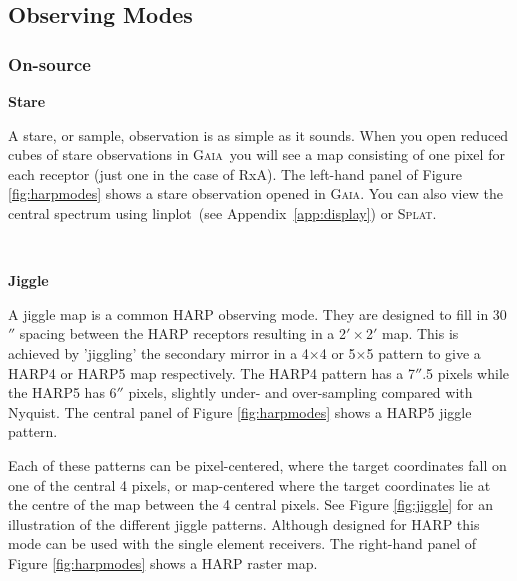 \documentclass[twoside,11pt]{article}
\newcommand{\htmlref}[2]{#1}
\newcommand{\latexhtml}[2]{#1}
\newcommand{\xref}[3]{#1}
\newcommand{\xlabel}[1]{}
\renewcommand{\_}{\texttt{\symbol{95}}}
\newcommand{\gaia}{\xref{\textsc{Gaia}}{sun214}{}}
\newcommand{\splat}{\xref{\textsc{Splat}}{sun243}{}}
\newcommand{\task}[1]{\textsf{#1}}
\newcommand{\linplot}{\xref{\task{linplot}}{sun95}{LINPLOT}}
\newcommand{\cref}[3]{\latexhtml{#1~\ref{#2}}{\htmlref{#3}{#2}}}
\begin{document}
\subsection{\xlabel{obsmodes}Observing Modes}
\label{sec:obsmodes}

\subsubsection{On-source}

\begin{minipage}[t]{0.14\linewidth}
\textbf{Stare}
\end{minipage}
\begin{minipage}[t]{0.85\linewidth}
A stare, or sample, observation is as simple as it sounds. When you open reduced cubes of stare observations in \gaia\ you will see a map consisting of one pixel for each receptor (just one in the case of RxA). The left-hand panel of Figure \ref{fig:harpmodes} shows a stare observation opened in \gaia. You can also view the central spectrum using \linplot\ (see \cref{Appendix}{app:display}{Viewing your data with KAPPA}) or \splat. 
\end{minipage}
\vspace{0.7cm}\\
\begin{minipage}[t]{0.14\linewidth}
\textbf{Jiggle}
\end{minipage}
\begin{minipage}[t]{0.85\linewidth}
A jiggle map is a common HARP observing mode. They are designed to fill in 30$''$ spacing between the HARP receptors resulting in a 2$'\times$2$'$ map. This is achieved by 'jiggling' the secondary mirror in a 4$\times$4 or 5$\times$5 pattern to give a HARP4 or HARP5 map respectively.   The HARP4 pattern has a 7$''$.5 pixels while the HARP5 has 6$''$ pixels, slightly under- and over-sampling compared with Nyquist. The central panel of Figure \ref{fig:harpmodes} shows a HARP5 jiggle pattern.  

Each of these patterns can be pixel-centered, where the target coordinates fall on one of the central 4 pixels, or map-centered where the target coordinates lie at the centre of the map between the 4 central pixels. See Figure \ref{fig:jiggle} for an illustration of the different jiggle patterns. Although designed for HARP this mode can be used with the single element receivers. The right-hand panel of Figure \ref{fig:harpmodes} shows a HARP raster map.
\end{minipage}
\vspace{0.7cm}\\
\end{document}
